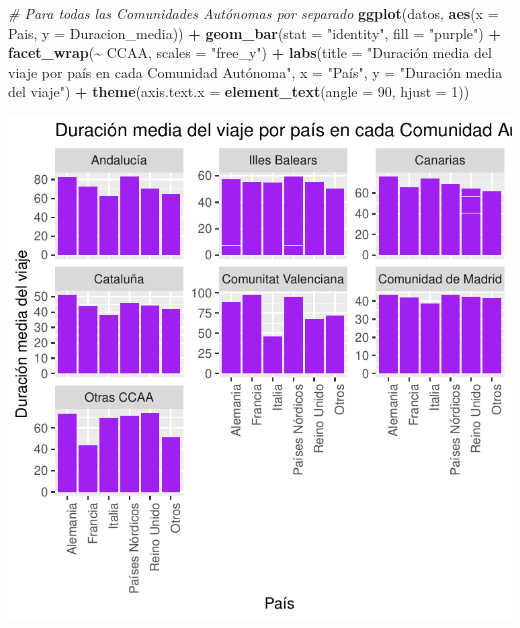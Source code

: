 \documentclass[notspecified,article,submit,moreauthors,pdftex]{Definitions/mdpi}
\newenvironment{Shaded}{\begin{snugshade}}{\end{snugshade}}
\newcommand{\AttributeTok}[1]{\textcolor[rgb]{0.13,0.29,0.53}{#1}}
\newcommand{\CommentTok}[1]{\textcolor[rgb]{0.56,0.35,0.01}{\textit{#1}}}
\newcommand{\DecValTok}[1]{\textcolor[rgb]{0.00,0.00,0.81}{#1}}
\newcommand{\FunctionTok}[1]{\textcolor[rgb]{0.13,0.29,0.53}{\textbf{#1}}}
\newcommand{\NormalTok}[1]{#1}
\newcommand{\SpecialCharTok}[1]{\textcolor[rgb]{0.81,0.36,0.00}{\textbf{#1}}}
\newcommand{\StringTok}[1]{\textcolor[rgb]{0.31,0.60,0.02}{#1}}
\begin{document}
\begin{Shaded}
\begin{Highlighting}[]
\CommentTok{\# Para todas las Comunidades Autónomas por separado}
\FunctionTok{ggplot}\NormalTok{(datos, }\FunctionTok{aes}\NormalTok{(}\AttributeTok{x =}\NormalTok{ Pais, }\AttributeTok{y =}\NormalTok{ Duracion\_media)) }\SpecialCharTok{+} 
  \FunctionTok{geom\_bar}\NormalTok{(}\AttributeTok{stat =} \StringTok{"identity"}\NormalTok{, }\AttributeTok{fill =} \StringTok{"purple"}\NormalTok{) }\SpecialCharTok{+}
  \FunctionTok{facet\_wrap}\NormalTok{(}\SpecialCharTok{\textasciitilde{}}\NormalTok{ CCAA, }\AttributeTok{scales =} \StringTok{"free\_y"}\NormalTok{) }\SpecialCharTok{+}  
  \FunctionTok{labs}\NormalTok{(}\AttributeTok{title =} \StringTok{"Duración media del viaje por país en cada Comunidad Autónoma"}\NormalTok{, }
       \AttributeTok{x =} \StringTok{"País"}\NormalTok{, }
       \AttributeTok{y =} \StringTok{"Duración media del viaje"}\NormalTok{) }\SpecialCharTok{+}
  \FunctionTok{theme}\NormalTok{(}\AttributeTok{axis.text.x =} \FunctionTok{element\_text}\NormalTok{(}\AttributeTok{angle =} \DecValTok{90}\NormalTok{, }\AttributeTok{hjust =} \DecValTok{1}\NormalTok{))}
\end{Highlighting}
\end{Shaded}

\includegraphics{ProyectoAED2024_Rmd_files/figure-latex/unnamed-chunk-28-1.pdf}
\end{document}
